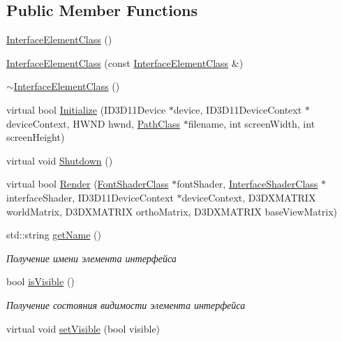 \subsection*{Public Member Functions}
\begin{DoxyCompactItemize}
\item 
\hyperlink{class_interface_element_class_aefb7fd1e3f6292cc38992d1dfa3d7efd}{Interface\+Element\+Class} ()
\item 
\hyperlink{class_interface_element_class_ab3fd5ab4cf98254b4ea1a0faf60f0f04}{Interface\+Element\+Class} (const \hyperlink{class_interface_element_class}{Interface\+Element\+Class} \&)
\item 
\hyperlink{class_interface_element_class_a8a9d3cf0dfe277e439bc98a5ff285023}{$\sim$\+Interface\+Element\+Class} ()
\item 
virtual bool \hyperlink{class_interface_element_class_ac2c55670417d747393bd77337464551f}{Initialize} (I\+D3\+D11\+Device $\ast$device, I\+D3\+D11\+Device\+Context $\ast$device\+Context, H\+W\+ND hwnd, \hyperlink{class_path_class}{Path\+Class} $\ast$filename, int screen\+Width, int screen\+Height)
\item 
virtual void \hyperlink{class_interface_element_class_aa710f6d66c3aa4c2d0a23fdd2b75a1f0}{Shutdown} ()
\item 
virtual bool \hyperlink{class_interface_element_class_a18b876383a39bb3fb1a6325f6518befc}{Render} (\hyperlink{class_font_shader_class}{Font\+Shader\+Class} $\ast$font\+Shader, \hyperlink{class_interface_shader_class}{Interface\+Shader\+Class} $\ast$interface\+Shader, I\+D3\+D11\+Device\+Context $\ast$device\+Context, D3\+D\+X\+M\+A\+T\+R\+IX world\+Matrix, D3\+D\+X\+M\+A\+T\+R\+IX ortho\+Matrix, D3\+D\+X\+M\+A\+T\+R\+IX base\+View\+Matrix)
\item 
std\+::string \hyperlink{class_interface_element_class_a7815b1d9629ff4dc8a83c170dbb171fc}{get\+Name} ()
\begin{DoxyCompactList}\small\item\em Получение имени элемента интерфейса \end{DoxyCompactList}\item 
bool \hyperlink{class_interface_element_class_a8d2250d84fd5bd69683dd3fe98becafd}{is\+Visible} ()
\begin{DoxyCompactList}\small\item\em Получение состояния видимости элемента интерфейса \end{DoxyCompactList}\item 
virtual void \hyperlink{class_interface_element_class_ad7981e5bad3db0c073ca1301dee44d6f}{set\+Visible} (bool visible)

\end{DoxyCompactItemize}
